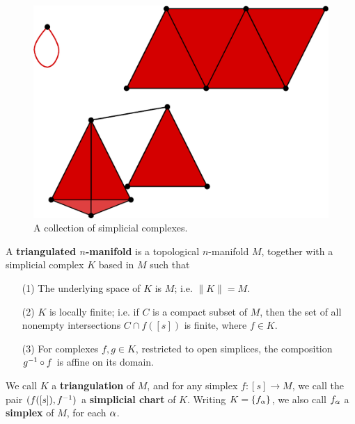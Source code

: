 \begin{figure}[h]
    \centering
    \includegraphics[scale=0.5]{Figures/Chapter1/simplicial_complexes.eps}
    \caption{A collection of simplicial complexes.}
    \label{figure_1.9}
\end{figure}

\begin{definition}
    A \textbf{triangulated $n$-manifold} is a topological $n$-manifold $M$,
    together with a simplicial complex $K$ based in  $M$ such that
    \begin{enumerate}
        \item[(1)] The underlying space of $K$ is  $M$; i.e.  $\|K\|=M$.

        \item[(2)] $K$ is locally finite; i.e. if  $C$ is a compact subset of
            $M$, then the set of all nonempty intersections  $C \cap f([s])$ is
            finite, where $f \in K$.

        \item[(3)] For complexes $f,g \in K$, restricted to open simplices, the
            composition  $g^{-1} \circ f$ is affine on its domain.
    \end{enumerate}
    We call $K$ a  \textbf{triangulation} of $M$, and for any simplex $f:[s]
    \xrightarrow{} M$, we call the pair $(f([s]),f^{-1})$ a \textbf{simplicial
    chart} of $K$. Writing $K=\{f_\alpha\}$, we also call  $f_\alpha$ a
    \textbf{simplex} of $M$, for each  $\alpha$.
\end{definition}

